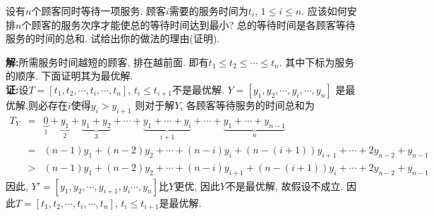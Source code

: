 \begin{problem}[习题4.1]
设有$n$个顾客同时等待一项服务. 顾客$i$需要的服务时间为$t_i$, $1\leq i\leq n$. 应该如何安排$n$个顾客的服务次序才能使总的等待时间达到最小? 总的等待时间是各顾客等待服务的时间的总和. 试给出你的做法的理由(证明).
\end{problem}
\begin{solution}
\textbf{解:}所需服务时间越短的顾客, 排在越前面. 即有$t_1\leq t_2\leq \cdots \leq t_n$. 其中下标为服务的顺序. 下面证明其为最优解.\\
\textbf{证:}设$T=[t_1,t_2,\cdots,t_i,\cdots,t_n]$, $t_i\leq t_{i+1}$不是最优解. $Y=[y_1,y_2,\cdots,y_i,\cdots,y_n]$ 是最优解,则必存在$i$使得$y_i>y_{i+1}$
则对于解$Y$, 各顾客等待服务的时间总和为
{\setlength\arraycolsep{2pt}
\begin{eqnarray}
T_{Y} & = & \underbrace{0}_{1}+ \underbrace{y_1}_{2} + \underbrace{y_1+y_2}_{3} + \cdots + \underbrace{y_1+\cdots + y_{i}}_{i+1} + \cdots + \underbrace{y_1+\cdots + y_{n-1}}_{n}\nonumber\\
& = & (n-1)y_1 + (n-2)y_2 +\cdots +(n-i)y_i + (n-(i+1))y_{i+1} + \cdots + 2y_{n-2} + y_{n-1}\nonumber\\
& > & (n-1)y_1 + (n-2)y_2 +\cdots +(n-i)y_{i+1} + (n-(i+1))y_{i} + \cdots + 2y_{n-2} + y_{n-1}\nonumber
\end{eqnarray}}
因此, $Y'=[y_1,y_2,\cdots,y_{i+1},y_i\cdots,y_n]$比$Y$更优, 因此$Y$不是最优解, 故假设不成立. 因此$T=[t_1,t_2,\cdots,t_i,\cdots,t_n]$, $t_i\leq t_{i+1}$是最优解.

\end{solution}
